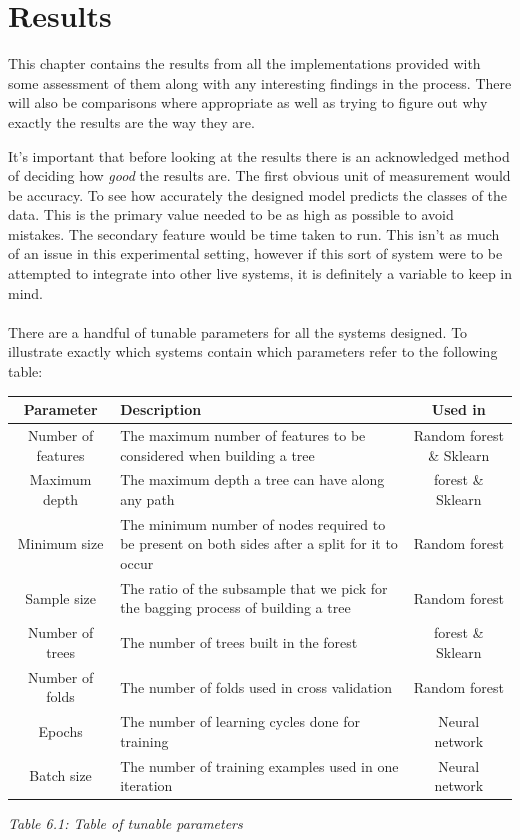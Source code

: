 

\chapter{Results}

\label{Chapter6}
This chapter contains the results from all the implementations provided with some assessment of them along with any interesting findings in the process. There will also be comparisons where appropriate as well as trying to figure out why exactly the results are the way they are. 


It's important that before looking at the results there is an acknowledged method of deciding how \textit{good} the results are. 
The first obvious unit of measurement would be accuracy. To see how accurately the designed model predicts the classes of the data. This is the primary value needed to be as high as possible to avoid mistakes. The secondary feature would be time taken to run. This isn't as much of an issue in this experimental setting, however if this sort of system were to be attempted to integrate into other live systems, it is definitely a variable to keep in mind. 
\\
\\
There are a handful of tunable parameters for all the systems designed. To illustrate exactly which systems contain which parameters refer to the following table:


\begin{center}
\begin{tabular}{|c | m{7cm} | c |}
\hline
Parameter & Description & Used in \\
\hline
Number of features & The maximum number of features to be considered when building a tree  & Random forest \& Sklearn \\
\hline
Maximum depth & The maximum depth a tree can have along any path & forest \& Sklearn \\
\hline
Minimum size & The minimum number of nodes required to be present on both sides after a split for it to occur & Random forest \\
\hline
Sample size & The ratio of the subsample that we pick for the bagging process of building a tree & Random forest \\
\hline
Number of trees & The number of trees built in the forest & forest \& Sklearn \\
\hline
Number of folds & The number of folds used in cross validation & Random forest \\
\hline
Epochs & The number of learning cycles done for training & Neural network \\
\hline
Batch size & The number of training examples used in one iteration & Neural network \\
\hline

\end{tabular}
\textit{Table 6.1: Table of tunable parameters}
\end{center}

